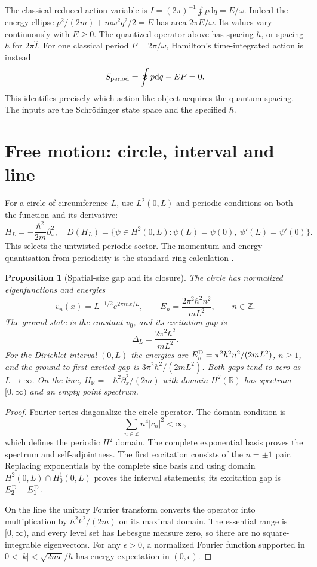 \documentclass[11pt,a4paper]{article}
\newtheorem{proposition}{Proposition}
\newcommand{\dd}{\mathrm{d}}
\newcommand{\R}{\mathbb R}
\newcommand{\Z}{\mathbb Z}
\begin{document}
The classical reduced action variable is $I=(2\pi)^{-1}\oint p\dd q=E/\omega$.
Indeed the energy ellipse
$p^2/(2m)+m\omega^2q^2/2=E$ has area $2\pi E/\omega$.
Its values vary continuously with $E\ge0$. The quantized operator above has
spacing $\hbar$, or spacing $h$ for $2\pi\widehat I$.
For one classical period $P=2\pi/\omega$, Hamilton's time-integrated action is
instead
\[
 S_{\rm period}=\oint p\dd q-EP=0.
\]
This identifies precisely which action-like object acquires the quantum spacing.
The inputs are the Schr\"odinger state space and the specified $\hbar$.

\section{Free motion: circle, interval and line}
For a circle of circumference $L$, use $L^2(0,L)$ and periodic conditions on
both the function and its derivative:
\[
 H_L=-\frac{\hbar^2}{2m}\partial_x^2,\quad
 D(H_L)=\{\psi\in H^2(0,L):\psi(L)=\psi(0),\ \psi'(L)=\psi'(0)\}.
\]
This selects the untwisted periodic sector.
The momentum and energy quantisation from periodicity is the standard ring
calculation \cite[Lecture 23, chapter 2]{YalePHYS201Lecture23}.

\begin{proposition}[Spatial-size gap and its closure]\label{prop:circle}
The circle has normalized eigenfunctions and energies
\[
 v_n(x)=L^{-1/2}e^{2\pi inx/L},\qquad
 E_n=\frac{2\pi^2\hbar^2n^2}{mL^2},\qquad n\in\Z.
\]
The ground state is the constant $v_0$, and its excitation gap is
\[
 \Delta_L=\frac{2\pi^2\hbar^2}{mL^2}.
\]
For the Dirichlet interval $(0,L)$ the energies are
$E_n^{\rm D}=\pi^2\hbar^2n^2/(2mL^2)$, $n\ge1$, and the ground-to-first-excited
gap is $3\pi^2\hbar^2/(2mL^2)$. Both gaps tend to zero as $L\to\infty$.
On the line, $H_\R=-\hbar^2\partial_x^2/(2m)$ with domain $H^2(\R)$ has
spectrum $[0,\infty)$ and an empty point spectrum.
\end{proposition}
\begin{proof}
Fourier series diagonalize the circle operator. The domain condition is
\[\sum_{n\in\Z}n^4|c_n|^2<\infty,\]
which defines the periodic $H^2$ domain.
The complete exponential basis proves the spectrum and self-adjointness.
The first excitation consists of the $n=\pm1$ pair. Replacing exponentials
by the complete sine basis and using domain $H^2(0,L)\cap H^1_0(0,L)$ proves
the interval statements; its excitation gap is $E_2^{\rm D}-E_1^{\rm D}$.

On the line the unitary Fourier transform converts the operator into
multiplication by $\hbar^2k^2/(2m)$ on its maximal domain. The essential range
is $[0,\infty)$, and every level set has Lebesgue measure zero, so there are
no square-integrable eigenvectors. For any $\epsilon>0$, a normalized Fourier
function supported in
$0<|k|<\sqrt{2m\epsilon}/\hbar$ has energy expectation in $(0,\epsilon)$.
\end{proof}
\end{document}
